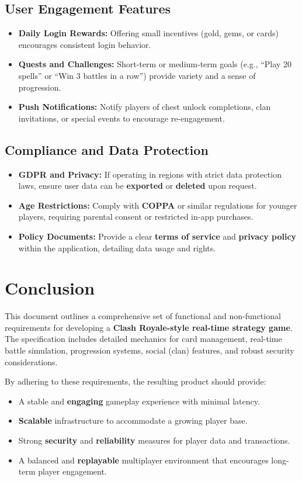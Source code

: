 \documentclass{article}
\begin{document}
\subsection{User Engagement Features}
\begin{itemize}
    \item \textbf{Daily Login Rewards:} Offering small incentives (gold, gems, or cards) encourages consistent login behavior.
    \item \textbf{Quests and Challenges:} Short-term or medium-term goals (e.g., ``Play 20 spells'' or ``Win 3 battles in a row'') provide variety and a sense of progression.
    \item \textbf{Push Notifications:} Notify players of chest unlock completions, clan invitations, or special events to encourage re-engagement.
\end{itemize}

\subsection{Compliance and Data Protection}
\begin{itemize}
    \item \textbf{GDPR and Privacy:} If operating in regions with strict data protection laws, ensure user data can be \textbf{exported} or \textbf{deleted} upon request.
    \item \textbf{Age Restrictions:} Comply with \textbf{COPPA} or similar regulations for younger players, requiring parental consent or restricted in-app purchases.
    \item \textbf{Policy Documents:} Provide a clear \textbf{terms of service} and \textbf{privacy policy} within the application, detailing data usage and rights.
\end{itemize}

\section{Conclusion}
This document outlines a comprehensive set of functional and non-functional requirements for developing a \textbf{Clash Royale-style real-time strategy game}. The specification includes detailed mechanics for card management, real-time battle simulation, progression systems, social (clan) features, and robust security considerations.

By adhering to these requirements, the resulting product should provide:
\begin{itemize}
    \item A stable and \textbf{engaging} gameplay experience with minimal latency.
    \item \textbf{Scalable} infrastructure to accommodate a growing player base.
    \item Strong \textbf{security} and \textbf{reliability} measures for player data and transactions.
    \item A balanced and \textbf{replayable} multiplayer environment that encourages long-term player engagement.
\end{itemize}
\end{document}
